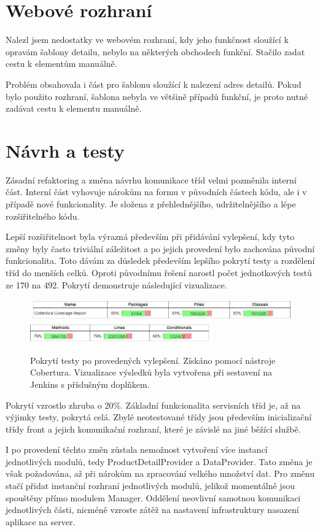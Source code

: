 \documentclass[thesis=B,czech]{FITthesis}[2012/06/26]
\begin{document}
\section{Webové rozhraní}\label{ch:web-interface}
Nalezl jsem nedostatky ve webovém rozhraní, kdy jeho funkčnost sloužící k opravám šablony detailu, nebylo na některých obchodech funkční.
Stačilo zadat cestu k elementům manuálně. 
\par
Problém obsahovala i část pro šablonu sloužící k nalezení adres detailů. Pokud bylo použito rozhraní, šablona nebyla ve většině
případů funkční, je proto nutné zadávat cestu k elementu manuálně.

\section{Návrh a testy}
Zásadní refaktoring a změna návrhu komunikace tříd velmi pozměnila interní část. 
Interní část vyhovuje nárokům na formu v původních částech kódu, ale i v případě nové funkcionality. Je složena z přehlednějšího, udržitelnějšího a
lépe rozšiřitelného kódu.
\par
Lepší rozšiřitelnost byla výrazná především při přidávání vylepšení, kdy
tyto změny byly často triviální záležitost a po jejich provedení bylo zachována
původní funkcionalita. Toto dávám za důsledek především lepšího pokrytí
testy a rozdělení tříd do menších celků. Oproti původnímu řešení narostl počet jednotkových
testů ze 170 na 492. Pokrytí demonstruje následující vizualizace.

\begin{figure}[h]\centering
 	\includegraphics[width=1.0\textwidth]{resources/cobertura-report-new-1}
 	\includegraphics[width=0.7\textwidth]{resources/cobertura-report-new-2}
	\caption[Pokrytí testy po provedených vylepšení]{Pokrytí testy po provedených vylepšení. Získáno pomocí nástroje Cobertura. Vizualizace
	výsledků byla vytvořena při sestavení na Jenkins s příslušným doplňkem.}\label{fig:cober-new}
\end{figure}

Pokrytí vzrostlo zhruba o 20\%. Základní funkcionalita servisních tříd je, až na výjimky testy, pokrytá celá.
Zbylé neotestované třídy jsou především inicializační třídy front a jejich komunikační rozhraní, které je závislé na jiné běžící službě.
\par
I po provedení těchto změn zůstala nemožnost vytvoření více instancí jednotlivých modulů, tedy ProductDetailProvider a DataProvider.
Tato změna je však požadována, až při nárokům na zpracování velkého množství dat. Pro změnu stačí přidat instanční rozhraní jednotlivých modulů, jelikož momentálně jsou spouštěny přímo modulem Manager. Oddělení neovlivní samotnou komunikaci jednotlivých části, nicméně 
vzroste zátěž na nastavení infrastruktury nasazení aplikace na server.
\end{document}
